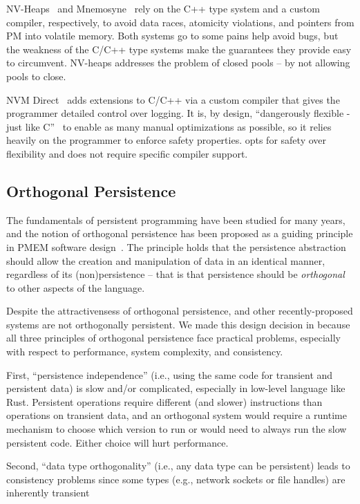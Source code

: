 NV-Heaps~\cite{nvheaps} and Mnemosyne~\cite{mnemosyne} rely on the C++ type system and a custom compiler, respectively, to avoid data races, atomicity violations, and pointers from PM into volatile memory.  Both systems go to some pains help avoid bugs, but the weakness of the C/C++ type systems make the guarantees they provide easy to circumvent.  NV-heaps addresses the problem of closed pools -- by not allowing pools to close.

NVM Direct~\cite{oracle-nvm-direct} adds extensions to C/C++ via a custom compiler that gives the programmer detailed control over logging.  It is, by design, ``dangerously flexible - just like C''~\cite{personalbillbridge} to enable as many manual optimizations as possible, so it relies heavily on the programmer to enforce safety properties.  \This{} opts for safety over flexibility and does not require specific compiler support.

\subsection{Orthogonal Persistence}

The fundamentals of persistent programming have been studied for many years,
and the notion of orthogonal persistence has been proposed as a guiding
principle in PMEM software design~\cite{atkinson1995orthogonally}.  The
principle holds that the persistence abstraction should allow the creation and
manipulation of data in an identical manner, regardless of its
(non)persistence -- that is that persistence should be \emph{orthogonal} to
other aspects of the language.


Despite the attractivensess of orthogonal persistence, \this{} and other
recently-proposed systems are not orthogonally persistent.  We made this design
decision in \this{} because all three principles of orthogonal persistence face practical
problems, especially with respect to performance, system complexity, and
consistency.%

First, “persistence independence” (i.e., using the same code for
transient and persistent data) is slow and/or complicated, especially in
low-level language like Rust. Persistent operations require different (and
slower) instructions than operations on transient data, and an orthogonal
system would require a runtime mechanism to choose which version to run or
would need to always run the slow persistent code.  Either choice will hurt
performance.

Second, “data type orthogonality” (i.e., any data type can be persistent) leads to consistency problems
since some types (e.g., network sockets or file handles) are inherently
transient


